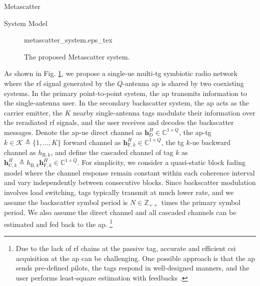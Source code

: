 \documentclass[journal]{IEEEtran}
\begin{document}
\begin{section}{Metascatter}
	\begin{subsection}{System Model}
		\begin{figure}[!t]
			\centering
			\def\svgwidth{0.9\columnwidth}
			{metascatter_system.eps_tex}
			\caption{The proposed Metascatter system.}
			\label{fi:metascatter_system}
		\end{figure}
		As shown in Fig. \ref{fi:metascatter_system}, we propose a single-\gls{ue} multi-\gls{tg} symbiotic radio network where the \gls{rf} signal generated by the $Q$-antenna \gls{ap} is shared by two coexisting systems.
		In the primary point-to-point system, the \gls{ap} transmits information to the single-antenna user.
		In the secondary backscatter system, the \gls{ap} acts as the carrier emitter, the $K$ nearby single-antenna tags modulate their information over the reradiated \gls{rf} signals, and the user receives and decodes the backscatter messages.
		Denote the \gls{ap}-\gls{ue} direct channel as $\boldsymbol{h}_{\mathrm{D}}^H \in \mathbb{C}^{1 \times Q}$, the \gls{ap}-\gls{tg} $k \in \mathcal{K} \triangleq \{1,\ldots,K\}$ forward channel as $\boldsymbol{h}_{\mathrm{F},k}^H \in \mathbb{C}^{1 \times Q}$, the \gls{tg} $k$-\gls{ue} backward channel as $h_{\mathrm{B},k}$, and define the cascaded channel of tag $k$ as $\boldsymbol{h}_{\mathrm{C},k}^H \triangleq h_{\mathrm{B},k} \boldsymbol{h}_{\mathrm{F},k}^H \in \mathbb{C}^{1 \times Q}$.
		For simplicity, we consider a quasi-static block fading model where the channel response remain constant within each coherence interval and vary independently between consecutive blocks.
		Since backscatter modulation involves load switching, tags typically transmit at much lower rate, and we assume the backscatter symbol period is $N \in \mathbb{Z}_{++}$ times the primary symbol period.
		We also assume the direct channel and all cascaded channels can be estimated and fed back to the \gls{ap}.
		\footnote{
			Due to the lack of \gls{rf} chains at the passive tag, accurate and efficient \gls{csi} acquisition at the \gls{ap} can be challenging.
			One possible approach is that the \gls{ap} sends pre-defined pilots, the tags respond in well-designed manners, and the user performs least-square estimation with feedbacks \cite{Bharadia2015,Yang2015b,Guo2019g}.
		}


\end{subsection}
\end{section}
\end{document}
